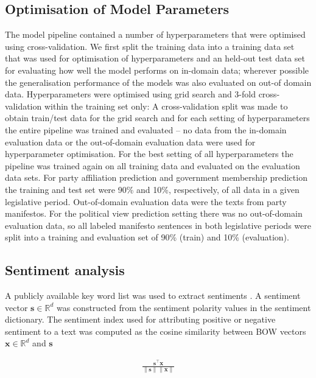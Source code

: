 \documentclass[runningheads,a4paper]{llncs}
\renewcommand{\vec}[1]{\mathbf{#1}}
\newcommand{\R}{\mathds{R}}
\begin{document}
\subsection{Optimisation of Model Parameters}\label{sec:crossvalidation}
The model pipeline contained a number of  hyperparameters that were optimised using cross-validation.  
We first split the training data into a training data set that was used for optimisation of hyperparameters and an held-out test data set for evaluating how well the model performs on in-domain data; wherever possible the generalisation performance of the models was also evaluated on out-of domain data. Hyperparameters were optimised using grid search and 3-fold cross-validation within the training set only: A cross-validation split was made to obtain train/test data for the grid search and for each setting of hyperparameters the entire pipeline was trained and evaluated -- no data from the in-domain evaluation data or the out-of-domain evaluation data were used for hyperparameter optimisation. For the best setting of all hyperparameters the pipeline was trained again on all training data and evaluated on the evaluation data sets. For party affiliation prediction and government membership prediction the training and test set were 90\% and 10\%, respectively, of all data in a given legislative period. Out-of-domain evaluation data were the texts from party manifestos. For the political view prediction setting there was no out-of-domain evaluation data, so all labeled manifesto sentences in both legislative periods were split into a training and evaluation set of 90\% (train) and 10\% (evaluation). 

\subsection{Sentiment analysis}\label{sec:sentiment_analysis_methods}
A publicly available key word list was used to extract sentiments \cite{remquahey2010}. A sentiment vector $\vec{s}\in\R^d$ was constructed from the sentiment polarity values in the sentiment dictionary. The sentiment index used for attributing positive or negative sentiment to a text was computed as the cosine similarity between BOW vectors $\vec{x}\in\R^d$ and $\vec{s}$

\begin{align}
\frac{\vec{s}^\top \vec{x}}{\|\vec{s}\|\|\vec{x}\|}
\end{align}
\end{document}
